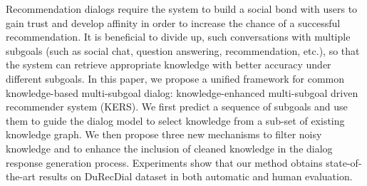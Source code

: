 Recommendation dialogs require the system to build a social bond with users to gain trust and develop affinity in order to increase the chance of a successful recommendation. It is beneficial to divide up, such conversations with multiple subgoals (such as social chat, question answering, recommendation, etc.), so that the system can retrieve appropriate knowledge with better accuracy under different subgoals. In this paper, we propose a unified framework for common knowledge-based multi-subgoal dialog: knowledge-enhanced multi-subgoal driven recommender system (KERS). We first predict a sequence of subgoals and use them to guide the dialog model to select knowledge from a sub-set of existing knowledge graph. We then propose three new mechanisms to filter noisy knowledge and to enhance the inclusion of cleaned knowledge in the dialog response generation process. Experiments show that our method obtains state-of-the-art results on DuRecDial dataset in both automatic and human evaluation.
